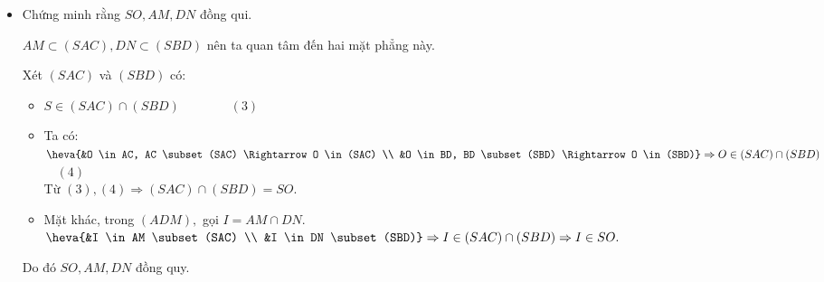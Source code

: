 \begin{bt}
\begin{vd}
{\begin{itemize}
			\item Chứng minh rằng $SO, AM, DN$ đồng qui.
			\begin{nx}
				$AM \subset (SAC), DN \subset (SBD)$ nên ta quan tâm đến hai mặt phẳng này.
			\end{nx}
			Xét $(SAC)$ và $(SBD)$ có:
			\begin{itemize}
				\item $S \in(SAC) \cap (SBD) \quad\quad\quad\quad (3)$
				\item Ta có: $\heva{&O \in AC, AC \subset (SAC) \Rightarrow O \in(SAC) \\ 
					&O \in BD, BD \subset(SBD) \Rightarrow O \in(SBD)} \Rightarrow O \in (SAC) \cap (SBD)$ $\quad (4)$\\
				Từ $(3),(4) \Rightarrow(SAC) \cap(SBD)=SO.$
				\item Mặt khác, trong $(ADM),$ gọi $I= AM \cap DN$.\\
				$\heva{&I \in AM \subset(SAC) \\ &I \in DN \subset(SBD)} \Rightarrow I \in(SAC) \cap(SBD) \Rightarrow I \in SO.$
			\end{itemize}
			Do đó $SO, AM, DN$ đồng quy.
		\end{itemize}
	}
\end{vd}


\end{bt}
